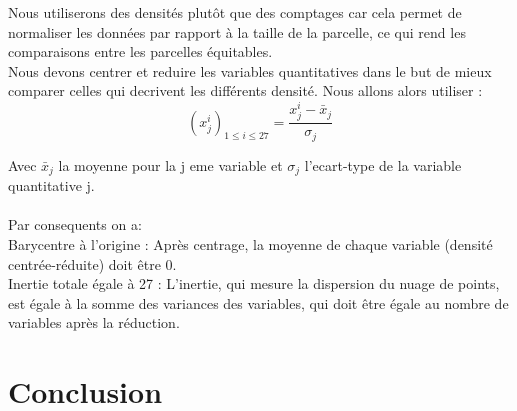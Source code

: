 \documentclass{article}
\begin{document}
Nous utiliserons des densités plutôt que des comptages car cela permet de normaliser les données par rapport à la taille de la parcelle,
ce qui rend les comparaisons entre les parcelles équitables.
\\
Nous devons centrer et reduire les variables quantitatives dans le but de mieux comparer celles qui decrivent les différents densité.
Nous allons alors utiliser :
\[
(x_j^i)_{1 \leq i \leq 27} = \frac{x_j^i - \bar{x}_j}{\sigma_j}
\]

Avec $\bar{x}_j$ la moyenne pour la j eme variable et  $\sigma_j$ l'ecart-type de la variable quantitative j.
\\
\\
Par consequents on a:
\\
Barycentre à l'origine : Après centrage, la moyenne de chaque variable (densité centrée-réduite) doit être 0.
\\
Inertie totale égale à 27 : L'inertie, qui mesure la dispersion du nuage de points, est égale à la somme des variances des variables, 
qui doit être égale au nombre de variables après la réduction.









\section{Conclusion}
\end{document}
